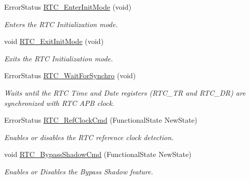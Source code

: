 \begin{DoxyCompactItemize}
Error\-Status \hyperlink{group___r_t_c___group1_ga679f8883cbfb267a53ffb1ab4cc5c8c5}{R\-T\-C\-\_\-\-Enter\-Init\-Mode} (void)
\begin{DoxyCompactList}\small\item\em Enters the R\-T\-C Initialization mode. \end{DoxyCompactList}\item 
void \hyperlink{group___r_t_c___group1_ga87f86f3b794205f09a1eac51738d900f}{R\-T\-C\-\_\-\-Exit\-Init\-Mode} (void)
\begin{DoxyCompactList}\small\item\em Exits the R\-T\-C Initialization mode. \end{DoxyCompactList}\item 
Error\-Status \hyperlink{group___r_t_c___group1_ga2938febeef6baf0d91cc066ca5caf095}{R\-T\-C\-\_\-\-Wait\-For\-Synchro} (void)
\begin{DoxyCompactList}\small\item\em Waits until the R\-T\-C Time and Date registers (R\-T\-C\-\_\-\-T\-R and R\-T\-C\-\_\-\-D\-R) are synchronized with R\-T\-C A\-P\-B clock. \end{DoxyCompactList}\item 
Error\-Status \hyperlink{group___r_t_c___group1_gaa60079ec257fb3a277d058ca8305533d}{R\-T\-C\-\_\-\-Ref\-Clock\-Cmd} (Functional\-State New\-State)
\begin{DoxyCompactList}\small\item\em Enables or disables the R\-T\-C reference clock detection. \end{DoxyCompactList}\item 
void \hyperlink{group___r_t_c___group1_gae5e7c682f15b8ae9ddd3b2a85a9df7db}{R\-T\-C\-\_\-\-Bypass\-Shadow\-Cmd} (Functional\-State New\-State)
\begin{DoxyCompactList}\small\item\em Enables or Disables the Bypass Shadow feature. \end{DoxyCompactList}\end{DoxyCompactItemize}


